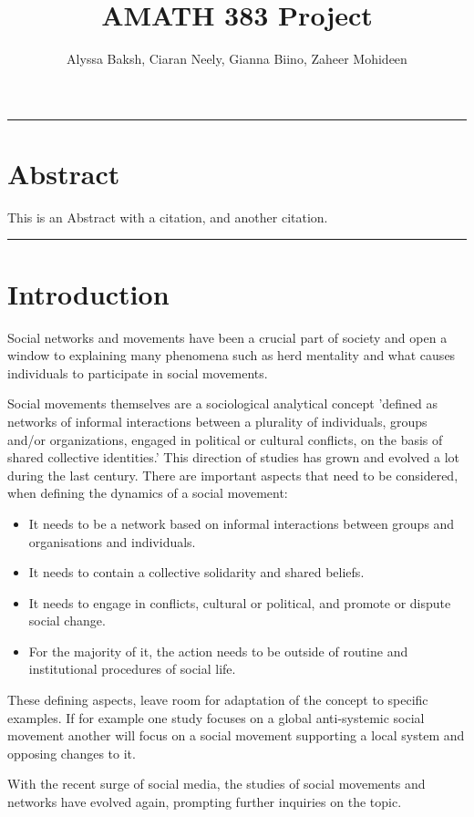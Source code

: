\documentclass{article}
\title{AMATH 383 Project}
\author{
    Alyssa Baksh, 
    Ciaran Neely,
    Gianna Biino,
    Zaheer Mohideen
}
\begin{document}
    \maketitle
    
    \hrule
    \section{Abstract}
    This is an Abstract with a citation\cite{kaveh_defining_2020}, and another citation\cite{small_movements_2021}.
    \hrule
    \section{Introduction}
    Social networks and movements have been a crucial part of society and open a window to explaining many phenomena such as herd mentality and what causes individuals to participate in social movements\cite{diani_networks_2013}.
    
    Social movements themselves are a sociological analytical concept 'defined as networks of informal interactions between a plurality of individuals, groups and/or organizations, engaged in political or cultural conflicts, on the basis of shared collective identities.' This direction of studies has grown and evolved a lot during the last century. There are important aspects that need to be considered, when defining the dynamics of a social movement: 
    \begin{itemize}
    \item It needs to be a network based on informal interactions between groups and organisations and individuals.
    \item It needs to contain a collective solidarity and shared beliefs.
    \item It needs to engage in conflicts, cultural or political, and promote or dispute social change.
    \item  For the majority of it, the action needs to be outside of routine and institutional procedures of social life.
    \end{itemize}
    These defining aspects, leave room for adaptation of the concept to specific examples. If for example one study focuses on a global anti-systemic social movement another will focus on a social movement supporting a local system and opposing changes to it\cite{diani_concept_1992}.
    
    With the recent surge of social media, the studies of social movements and networks have evolved again, prompting further inquiries on the topic\cite{kumar_structure_2006}.
    
\end{document}
